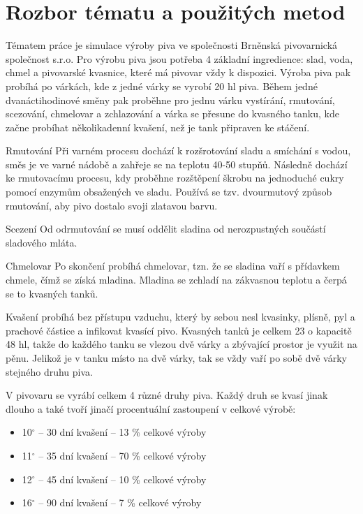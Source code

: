 \documentclass[11pt,a4paper]{article}
\begin{document}
\section{Rozbor tématu a použitých metod} \label{sec:rozbor}
Tématem práce je simulace \cite[str. 8]{pred} výroby piva ve společnosti Brněnská pivovarnická společnost s.r.o. Pro výrobu piva jsou potřeba 4 základní ingredience: slad, voda, chmel a pivovarské kvasnice, které má pivovar vždy k dispozici. Výroba piva pak probíhá po várkách, kde z jedné várky se vyrobí 20 hl piva. Během jedné dvanáctihodinové směny pak proběhne pro jednu várku vystírání, rmutování, scezování, chmelovar a zchlazování a várka se přesune do kvasného tanku, kde začne probíhat několikadenní kvašení, než je tank připraven ke stáčení.

Rmutování
Při varném procesu dochází k rozšrotování sladu a smíchání s vodou, směs je ve varné nádobě a zahřeje se na teplotu 40-50 stupňů. Následně dochází ke rmutovacímu procesu, kdy proběhne rozštěpení škrobu na jednoduché cukry pomocí enzymům obsažených ve sladu. Používá se tzv. dvourmutový způsob rmutování, aby pivo dostalo svoji zlatavou barvu.

Scezení
Od odrmutování se musí oddělit sladina od nerozpustných součástí sladového mláta.

Chmelovar
Po skončení probíhá chmelovar, tzn. že se sladina vaří s přídavkem chmele, čímž se získá mladina. Mladina se zchladí na zákvasnou teplotu a čerpá se to kvasných tanků. 

Kvašení probíhá bez přístupu vzduchu, který by sebou nesl kvasinky, plísně, pyl a prachové částice a infikovat kvasící pivo. Kvasných tanků je celkem 23 o kapacitě 48 hl, takže do každého tanku se vlezou dvě várky a zbývající prostor je využit na pěnu. Jelikož je v tanku místo na dvě várky, tak se vždy vaří po sobě dvě várky stejného druhu piva. 

V pivovaru se vyrábí celkem 4 různé druhy piva. Každý druh se kvasí jinak dlouho a také tvoří jinačí procentuální zastoupení v celkové výrobě:
\begin{itemize}
  \item 10$^\circ$ -- 30 dní kvašení -- 13 \% celkové výroby
  \item 11$^\circ$ -- 35 dní kvašení -- 70 \% celkové výroby
  \item 12$^\circ$ -- 45 dní kvašení -- 10 \% celkové výroby
  \item 16$^\circ$ -- 90 dní kvašení -- 7 \% celkové výroby
\end{itemize}
\end{document}
